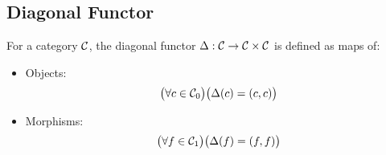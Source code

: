 \subsection{Diagonal Functor}
\begin{definition}
  For a category $\mathcal{C}$, the diagonal functor $\Delta: \mathcal{C} \to \mathcal{C}\times \mathcal{C}$ is
  defined as maps of:
  \begin{itemize}
    \item Objects:
      \[\big(\forall c\in \mathcal{C}_0\big)
        \big(\Delta(c) = (c,c)\big)\]
    \item Morphisms:
      \[\big(\forall f\in \mathcal{C}_1\big)
        \big(\Delta(f) = (f,f)\big)\]
  \end{itemize}
\end{definition}

